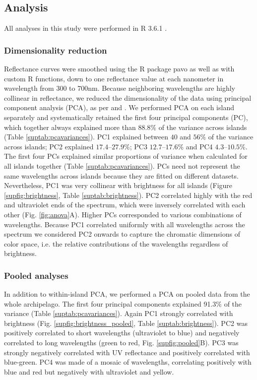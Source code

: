 \subsection*{Analysis}

All analyses in this study were performed in R 3.6.1 \citep{RCoreTeam2019}. 

\subsubsection*{Dimensionality reduction}

Reflectance curves were smoothed using the R package pavo \citep{Maia2013} as well as with custom R functions, down to one reflectance value at each nanometer in wavelength from 300 to 700nm. Because neighboring wavelengths are highly collinear in reflectance, we reduced the dimensionality of the data using principal component analysis (PCA), as per \citet{Cuthill1999} and \citet{Leal2002}. We performed PCA on each island separately and systematically retained the first four principal components (PC), which together always explained more than $88.8\%$ of the variance across islands (Table \ref{suptab:pcavariances}). PC1 explained between $40$ and $56$\% of the variance across islands; PC2 explained $17.4$--$27.9$\%; PC3 $12.7$--$17.6$\% and PC4 $4.3$--$10.5$\%. The first four PCs explained similar proportions of variance when calculated for all islands together (Table \ref{suptab:pcavariances}). PCs need not represent the same wavelengths across islands because they are fitted on different datasets. Nevertheless, PC1 was very collinear with brightness for all islands (Figure \ref{supfig:brightness}, Table \ref{suptab:brightness}). PC2 correlated highly with the red and ultraviolet ends of the spectrum, which were inversely correlated with each other (Fig. \ref{fig:anova}A). Higher PCs corresponded to various combinations of wavelengths. Because PC1 correlated uniformly with all wavelengths across the spectrum  we considered PC2 onwards to capture the chromatic dimensions of color space, i.e. the relative contributions of the wavelengths regardless of brightness.

\subsubsection*{Pooled analyses}

In addition to within-island PCA, we performed a PCA on pooled data from the whole archipelago. The first four principal components explained 91.3\% of the variance (Table \ref{suptab:pcavariances}). Again PC1 strongly correlated with brightness (Fig. \ref{supfig:brightness_pooled}, Table \ref{suptab:brightness}). PC2 was positively correlated to short wavelengths (ultraviolet to blue) and negatively correlated to long wavelengths (green to red, Fig. \ref{supfig:pooled}B). PC3 was strongly negatively correlated with UV reflectance and positively correlated with blue-green. PC4 was made of a mosaic of wavelengths, correlating positively with blue and red but negatively with ultraviolet and yellow.\\

